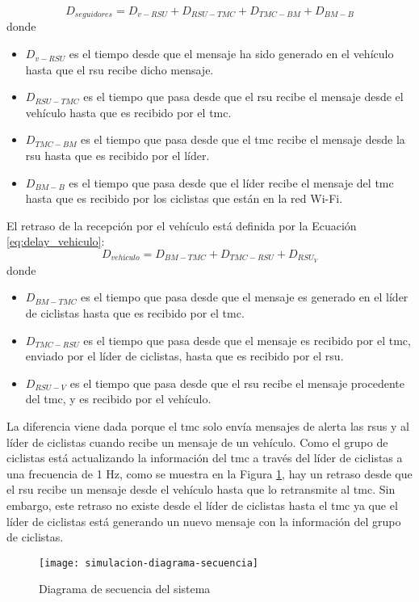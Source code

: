 \begin{equation}\label{eq:delay_seguidores}
D_{seguidores} = D_{v-RSU} + D_{RSU-TMC} + D_{TMC-BM} + D_{BM-B}
\end{equation}
donde
\begin{itemize}
	\item $D_{v-RSU}$ es el tiempo desde que el mensaje ha sido generado en el
	vehículo hasta que el \gls{rsu} recibe dicho mensaje.

	\item $D_{RSU-TMC}$ es el tiempo que pasa desde que el \gls{rsu} recibe el
	mensaje desde el vehículo hasta que es recibido por el \gls{tmc}.

	\item $D_{TMC-BM}$ es el tiempo que pasa desde que el \gls{tmc} recibe el
	mensaje desde la \gls{rsu} hasta que es recibido por el líder.

	\item $D_{BM-B}$ es el tiempo que pasa desde que el líder recibe el mensaje
	del \gls{tmc} hasta que es recibido por los ciclistas que están en la red
	Wi-Fi.
\end{itemize}

El retraso de la recepción por el vehículo está definida por la Ecuación
\ref{eq:delay_vehiculo}:
\begin{equation}\label{eq:delay_vehiculo}
D_{vehículo} = D_{BM-TMC} + D_{TMC-RSU} + D_{RSU_V}
\end{equation}
donde
\begin{itemize}
	\item $D_{BM-TMC}$ es el tiempo que pasa desde que el mensaje es generado en
	el líder de ciclistas hasta que es recibido por el \gls{tmc}.

	\item $D_{TMC-RSU}$ es el tiempo que pasa desde que el mensaje es recibido
	por el \gls{tmc}, enviado por el líder de ciclistas, hasta que es recibido
	por el \gls{rsu}.

	\item $D_{RSU-V}$ es el tiempo que pasa desde que el \gls{rsu} recibe el
	mensaje procedente del \gls{tmc}, y es recibido por el vehículo.
\end{itemize}

La diferencia viene dada porque el \gls{tmc} solo envía mensajes de alerta las
\gls{rsu}s y al líder de ciclistas cuando recibe un mensaje de un vehículo.
Como el grupo de ciclistas está actualizando la información del \gls{tmc} a
través del líder de ciclistas a una frecuencia de 1 Hz, como se muestra en la
Figura \ref{fig:simulacion-diagrama-secuencia}, hay un retraso desde que el
\gls{rsu} recibe un mensaje desde el vehículo hasta que lo retransmite al
\gls{tmc}. Sin embargo, este retraso no existe desde el líder de ciclistas
hasta el \gls{tmc} ya que el líder de ciclistas está generando un nuevo mensaje
con la información del grupo de ciclistas.

\begin{figure}[h]
	\texttt{[image: simulacion-diagrama-secuencia]}
	\caption{Diagrama de secuencia del sistema}
	\label{fig:simulacion-diagrama-secuencia}
\end{figure}
